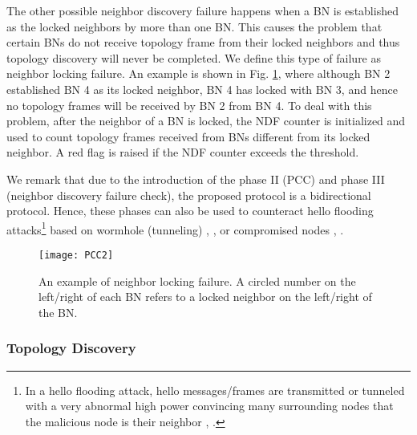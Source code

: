 \documentclass[10pt,english,two column]{IEEEtran}
\begin{document}
The other possible neighbor discovery failure happens when a BN is
established as the locked neighbors by more than one BN. This causes
the problem that certain BNs do not receive topology frame from their
locked neighbors and thus topology discovery will never be completed.
We define this type of failure as neighbor locking failure. An example
is shown in Fig. \ref{fig:PCC2}, where although BN 2 established
BN 4 as its locked neighbor, BN 4 has locked with BN 3, and hence
no topology frames will be received by BN 2 from BN 4. To deal with
this problem, after the neighbor of a BN is locked, the NDF counter
is initialized and used to count topology frames received from BNs
different from its locked neighbor. A red flag is raised if the NDF
counter exceeds the threshold. 

We remark that due to the introduction of the phase II (PCC) and phase
III (neighbor discovery failure check), the proposed protocol is a
bidirectional protocol. Hence, these phases can also be used to counteract
hello flooding attacks\footnote{In a hello flooding attack, hello messages/frames are transmitted
or tunneled with a very abnormal high power convincing many surrounding
nodes that the malicious node is their neighbor \cite{Karlof}, \cite{Haghighi}. } based on wormhole (tunneling) \cite{Hu}, \cite{Giannetsos}, or
compromised nodes \cite{Yoo}, \cite{Saghar}.

\begin{figure}[htbp]
\begin{centering}
\textsf{\texttt{[image: PCC2]}}
\par\end{centering}

\caption{\label{fig:PCC2}An example of neighbor locking failure. A circled
number on the left/right of each BN refers to a locked neighbor on
the left/right of the BN.}
\end{figure}



\subsubsection{Topology Discovery }
\end{document}
